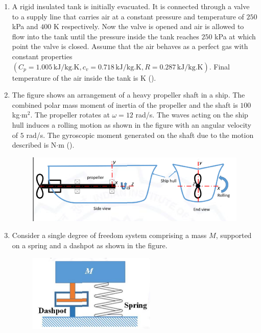 \documentclass[journal]{IEEEtran}
\begin{document}
\begin{enumerate}
\hfill{}

\item A rigid insulated tank is initially evacuated. It is connected through a valve to a supply line that carries air at a constant pressure and temperature of $250$ kPa and $400$ K respectively. Now the valve is opened and air is allowed to flow into the tank until the pressure inside the tank reaches $250$ kPa at which point the valve is closed. Assume that the air behaves as a perfect gas with constant properties $(C_p = 1.005\, \text{kJ/kg.K}, c_v = 0.718\, \text{kJ/kg.K}, R = 0.287\, \text{kJ/kg.K})$. Final temperature of the air inside the tank is \underline{\hspace{2cm}} K ().

\hfill{}

\item The figure shows an arrangement of a heavy propeller shaft in a ship. The combined polar mass moment of inertia of the propeller and the shaft is $100$ kg$\cdot$m$^2$. The propeller rotates at $\omega = 12$ rad/s. The waves acting on the ship hull induces a rolling motion as shown in the figure with an angular velocity of $5$ rad/s. The gyroscopic moment generated on the shaft due to the motion described is \underline{\hspace{2cm}} N$\cdot$m ().
\begin{figure}[h]
\centering
\includegraphics[width=0.5\columnwidth]{Figs/image (47).png}
\caption*{}
\label{fig:24}
\end{figure}

\hfill{}

\item Consider a single degree of freedom system comprising a mass $M$, supported on a spring and a dashpot as shown in the figure.
\begin{figure}[h]
\centering
\includegraphics[width=0.5\columnwidth]{Figs/image (48).png}
\caption*{}
\label{fig:25}
\end{figure}


\end{enumerate}
\end{document}
